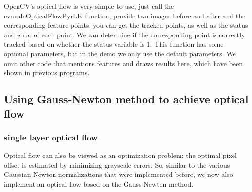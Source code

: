OpenCV's optical flow is very simple to use, just call the cv::calcOpticalFlowPyrLK function, provide two images before and after and the corresponding feature points, you can get the tracked points, as well as the status and error of each point. We can determine if the corresponding point is correctly tracked based on whether the status variable is 1. This function has some optional parameters, but in the demo we only use the default parameters. We omit other code that mentions features and draws results here, which have been shown in previous programs.

\subsection{Using Gauss-Newton method to achieve optical flow}
\subsubsection{single layer optical flow}
Optical flow can also be viewed as an optimization problem: the optimal pixel offset is estimated by minimizing grayscale errors. So, similar to the various Gaussian Newton normalizations that were implemented before, we now also implement an optical flow based on the Gauss-Newton method.


